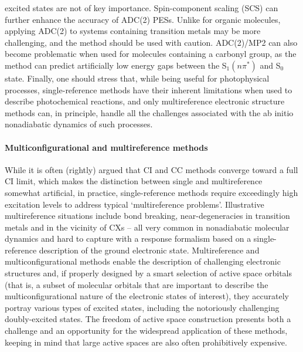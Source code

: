 \documentclass[9pt,bestpractices,pubversion]{livecoms}
\begin{document}
excited states are not of key importance. Spin-component scaling (SCS) can further enhance the accuracy of ADC(2) PESs.\cite{tajti2019accuracy} Unlike for organic molecules, applying ADC(2) to systems containing transition metals may be more challenging, and the method should be used with caution.\cite{plasser2015high} ADC(2)/MP2 can also become problematic when used for molecules containing a carbonyl group, as the method can predict artificially low energy gaps between the S$_1(n\pi^\ast)$ and S$_0$ state.\cite{marsili2021caveat} Finally, one should stress that, while being useful for photophysical processes, single-reference methods have their inherent limitations when used to describe photochemical reactions, and only multireference electronic structure methods can, in principle, handle all the challenges associated with the ab initio nonadiabatic dynamics of such processes.

\paragraph{Multiconfigurational and multireference methods}
 While it is often (rightly) argued that CI and CC methods converge toward a full CI limit,\cite{bartlett2017cc} which makes the distinction between single and multireference somewhat artificial, in practice, single-reference methods require exceedingly high excitation levels to address typical `multireference problems'. Illustrative multireference situations include bond breaking, near-degeneracies in transition metals and in the vicinity of CXs -- all very common in nonadiabatic molecular dynamics and hard to capture with a response formalism based on a single-reference description of the ground electronic state. Multireference and multiconfigurational methods enable the description of challenging electronic structures and, if properly designed by a smart selection of active space orbitals (that is, a subset of molecular orbitals that are important to describe the multiconfigurational nature of the electronic states of interest), they accurately portray various types of excited states, including the notoriously challenging doubly-excited states. The freedom of active space construction presents both a challenge and an opportunity for the widespread application of these methods, keeping in mind that large active spaces are also often prohibitively expensive.
\end{document}
